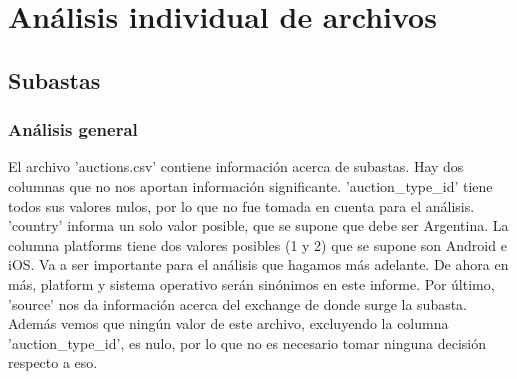 \documentclass[a4paper, 12pt]{article}
\newcommand\tab[1][1cm]{\hspace*{#1}}
\begin{document}
\section{Análisis individual de archivos}
\subsection{Subastas}
	\subsubsection{Análisis general} \label{analisis general}
	 \tab El archivo 'auctions.csv' contiene información acerca de subastas.
	Hay dos columnas que no nos aportan información significante. 'auction\_type\_id' tiene todos sus valores 		nulos, por lo que no fue tomada en cuenta para el análisis. 'country' informa un solo valor posible, que se supone que debe ser Argentina.
	\tab La columna platforms tiene dos valores posibles (1 y 2) que se supone son Android e iOS. Va a ser importante para el análisis que hagamos más adelante. De ahora en más, platform y sistema operativo serán sinónimos en este informe.
	\tab Por último, 'source' nos da información acerca del exchange de donde surge la subasta.
	\tab Además vemos que ningún valor de este archivo, excluyendo la columna 'auction\_type\_id', es nulo, por lo que no es necesario tomar ninguna decisión respecto a eso.
\end{document}
